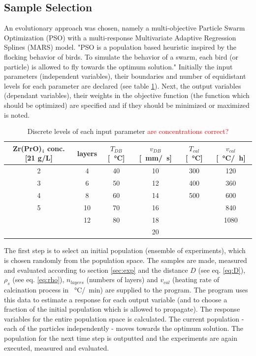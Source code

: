 \documentclass[a4paper]{article}
\newcommand{\td}[1]{\textcolor{red}{#1}}
\newcommand{\mm}[1]{\SI{#1}{\milli\meter}}
\newcommand{\minutes}[1]{\SI{#1}{\minute}}
\newcommand{\oc}[1]{\SI{#1}{\degreeCelsius}}
\newcommand{\s}[1]{\SI{#1}{\second}}
\newcommand{\h}[1]{\SI{#1}{\hour}}
\begin{document}
\subsection{Sample Selection}
\label{sec:ss}
An evolutionary approach was chosen, namely a multi-objective Particle Swarm Optimization (PSO) with a multi-response
Multivariate Adaptive Regression Splines (MARS) model\cite{Villanova2010,Kennedy1995,Breiman1997,Carta2011}.
%
"PSO is a population based heuristic inspired by the flocking behavior of birds. 
To simulate the behavior of a swarm, each bird (or particle) is allowed to fly towards the optimum solution."\cite{Villanova2010}
%
Initially the input parameters (independent variables), their boundaries and number of equidistant levels for each parameter are declared (see table \ref{tab:input}).
Next, the output variables (dependant variables), their weights in the objective function (the function which should be optimized) are specified and if they should be minimized or maximized is noted.
%
\begin{table}[htb]
	\centering
	\begin{tabular}{cc cc cc}
		\hline
		Zr(PrO)$_4$ conc. [21 g/L]	&layers	&$T_{DB}$[\oc{}]	&$v_{DB}$[\mm{}/\s{}]	&$T_{cal}$[\oc{}]	&$v_{cal}$[\oc{}/\h{}]	\\
		\hline
		2				&4		&40					&10				&300				&120	\\
		3				&6		&50					&12				&400				&360	\\
		4				&8		&60					&14				&500				&600	\\
		5				&10		&70					&16				&					&840	\\
						&12		&80					&18				&					&1080	\\
						&		&					&20				&					&		\\
		\hline
	\end{tabular}
	\caption{Discrete levels of each input parameter \td{are concentrations correct?}}
	\label{tab:input}
\end{table}

The first step is to select an initial population (ensemble of experiments), which is chosen randomly from the population space. 
The samples are made, measured and evaluated according to section \ref{sec:exp} and the distance $D$ (see eq. \ref{eq:D}), $\rho_s$ (see eq. \ref{eq:rho}), $n_{layers}$ (numbers of layers) and $v_{cal}$ (heating rate of calcination process in \oc{}/\minutes{}) are supplied to the program. 
The program uses this data to estimate a response for each output variable (and to choose a fraction of the initial population which is allowed to propagate).
The response variables for the entire population space is calculated. 
The current population - each of the particles independently - moves towards the optimum solution.
The population for the next time step is outputted and the experiments are again executed, measured and evaluated.
\end{document}
